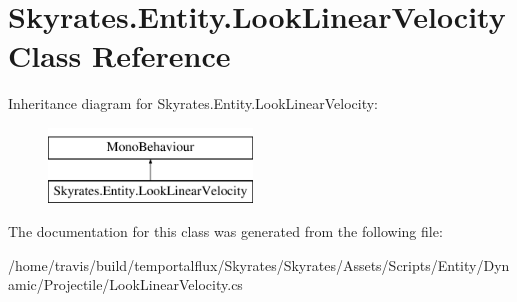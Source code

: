 \hypertarget{class_skyrates_1_1_entity_1_1_look_linear_velocity}{\section{Skyrates.\-Entity.\-Look\-Linear\-Velocity Class Reference}
\label{class_skyrates_1_1_entity_1_1_look_linear_velocity}
}
Inheritance diagram for Skyrates.\-Entity.\-Look\-Linear\-Velocity\-:\begin{figure}[H]
\begin{center}
\leavevmode
\includegraphics[height=2.000000cm]{class_skyrates_1_1_entity_1_1_look_linear_velocity}
\end{center}
\end{figure}


The documentation for this class was generated from the following file\-:\begin{DoxyCompactItemize}
\item 
/home/travis/build/temportalflux/\-Skyrates/\-Skyrates/\-Assets/\-Scripts/\-Entity/\-Dynamic/\-Projectile/Look\-Linear\-Velocity.\-cs\end{DoxyCompactItemize}

